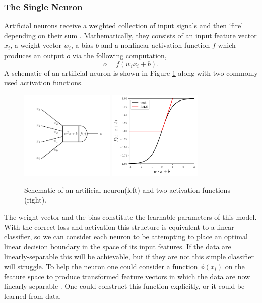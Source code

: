 \subsubsection{The Single Neuron}
Artificial neurons receive a weighted collection of input signals and then `fire' depending on their sum \cite{CS231n}. Mathematically, they consists of an input feature vector $x_{i}$, a weight vector $w_{i}$, a bias $b$ and a nonlinear activation function $f$ which produces an output $o$ via the following computation,
\begin{equation}
    o = f(w_{i}x_{i} + b).
\end{equation}
A schematic of an artificial neuron is shown in Figure \ref{fig:machine_learning:neuron_and_activation} along with two commonly used activation functions. 
\begin{figure}[h!]
    \begin{center}
        \includegraphics[width=0.4\textwidth]{figures/machine_learning/neuron.pdf}
        \includegraphics[width=0.4\textwidth]{figures/machine_learning/activation_functions.pdf}
    \end{center}
    \caption{Schematic of an artificial neuron(left) and two activation functions (right).}
        \label{fig:machine_learning:neuron_and_activation}
\end{figure}
The weight vector and the bias constitute the learnable parameters of this model. 
With the correct loss and activation this structure is equivalent to a linear classifier, so we can consider each neuron to be attempting to place an optimal linear decision boundary in the space of its input features. 
If the data are linearly-separable this will be achievable, but if they are not this simple classifier will struggle. 
To help the neuron one could consider a function $\phi(x_{i})$ on the feature space to produce transformed feature vectors in which the data are now linearly separable \cite{DeepLearningBook}. 
One could construct this function explicitly, or it could be learned from data. 



